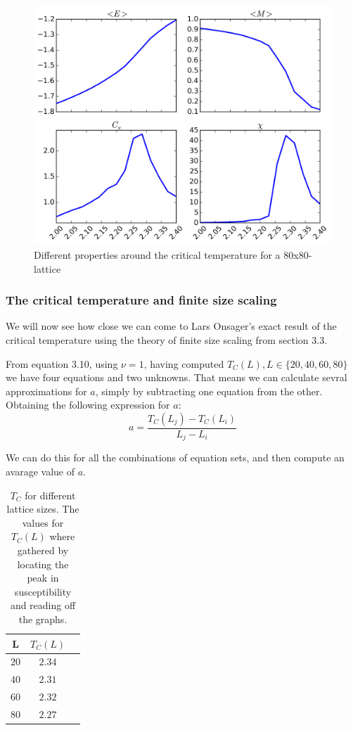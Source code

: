 \documentclass[11pt,a4paper,english,draft]{article}
\numberwithin{equation}{section}
\newcommand{\figurewidth}{.85\textwidth}
\begin{document}
\begin{figure}
\centering
\includegraphics[width=\figurewidth]{pics/e80.png}
\caption{Different properties around the critical temperature for 
a 80x80-lattice}
\label{fig:e80}
\end{figure}

\subsubsection{The critical temperature and finite size scaling}
We will now see how close we can come to Lars Onsager's exact result of the critical temperature using the theory of finite size scaling from section 3.3.

From equation 3.10, using $\nu = 1$, having computed $T_C(L), L \in \{20,40,60,80 \}$ we have four equations and two unknowns. That means we can calculate sevral approximations for $a$, simply by subtracting one equation from the other. Obtaining the following expression for $a$:
\begin{equation}
a = \frac{T_C(L_j)-T_C(L_i)}{L_j - L_i}
\end{equation}

 We can do this for all the combinations of equation sets, and then compute an avarage value of $a$. 
\begin{table}[!h]
\caption{ $T_C$ for different lattice sizes. The values for $T_C (L)$ where gathered by locating the peak in susceptibility and reading off the graphs.  }
\begin{center}
\vspace{5mm}
\begin{tabular}{| c | c | c |}
	\hline
	L  & $T_C(L)$  \\		\hline		
	$20$ & $2.34$ \\
    $40$ & $2.31$ \\
    $60$ & $2.32$ \\
    $80$ & $2.27$ \\
  \hline
\end{tabular}
\end{center}
\end{table} 
\end{document}
